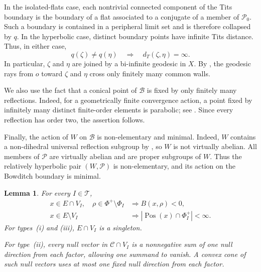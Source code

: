\documentclass[11pt,reqno]{amsart}
\theoremstyle{plain}
\newtheorem{lemma}[theorem]{Lemma}
\theoremstyle{definition}
\theoremstyle{remark}
\numberwithin{equation}{section}
\DeclareMathOperator{\Pos}{Pos}
\begin{document}
In the isolated-flats case, each nontrivial connected
component of the Tits boundary is the boundary of a flat
associated to a conjugate of a member of $\mathcal P_0$.
Such a boundary is contained in a peripheral limit set
and is therefore collapsed by $q$.
In the hyperbolic case, distinct boundary points have
infinite Tits distance.
Thus, in either case,
\[
    q(\zeta)\neq q(\eta)
    \quad\Longrightarrow\quad
    d_T(\zeta,\eta)=\infty.
\]
In particular, $\zeta$ and $\eta$ are joined by a
bi-infinite geodesic in $X$.
By \cite[Lemma~20]{LT}, the geodesic rays from $o$ toward
$\zeta$ and $\eta$ cross only finitely many common walls.

We also use the fact that a conical point of
$\mathcal B$ is fixed by only finitely many reflections.
Indeed, for a geometrically finite convergence action,
a point fixed by infinitely many distinct finite-order
elements is parabolic; see \cite[Section~6]{Bowditch}.
Since every reflection has order two, the assertion follows.

Finally, the action of $W$ on $\mathcal B$ is
non-elementary and minimal.
Indeed, $W$ contains a non-dihedral universal reflection
subgroup by \cite[Proposition~6.4]{DHR}, so $W$ is not
virtually abelian.
All members of $\mathcal P$ are virtually abelian and
are proper subgroups of $W$.
Thus the relatively hyperbolic pair $(W,\mathcal P)$
is non-elementary, and its action on the Bowditch
boundary is minimal.
\begin{lemma}\label{lem:32-carrier}
For every $I\in\mathcal T$,
\begin{align}
    x\in E\cap V_I,\quad
    \rho\in\Phi^+\setminus\Phi_I
    &\Longrightarrow B(x,\rho)<0,
    \label{eq:32-carrier1}\\
    x\in E\setminus V_I
    &\Longrightarrow
    |\Pos(x)\cap\Phi_I^+|<\infty.
    \label{eq:32-carrier2}
\end{align}
For types~\textup{(i)} and \textup{(iii)}, $E\cap V_I$
is a singleton.

For type~\textup{(ii)}, every null vector in
$\mathcal C\cap V_I$ is a nonnegative sum of one null
direction from each factor, allowing one summand to vanish.
A convex cone of such null vectors uses at most one fixed
null direction from each factor.
\end{lemma}
\end{document}
